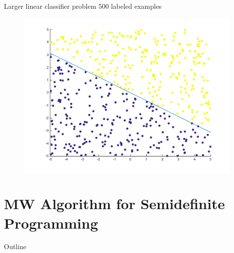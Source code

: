 \documentclass{beamer}
\begin{document}
\begin{frame}{Larger linear classifier problem}
500 labeled examples
\begin{figure}
\includegraphics[width=\textwidth]{Classifier500.png}
\end{figure}
\end{frame}

\section[MW for SDP]{MW Algorithm for Semidefinite Programming}
\begin{frame}{Outline}
  \tableofcontents[currentsection]
\end{frame}

\end{document}
